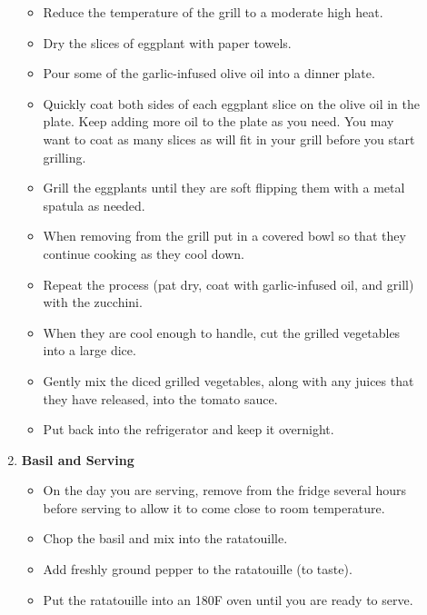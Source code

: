 \documentclass [11pt, letterpaper] {article}
\newcommand \fileName {GrilledRatatouille}
\begin{document}
\begin{description}
\begin{enumerate}
\begin{itemize}
		\item Reduce the temperature of the grill to a moderate high heat.
		\item Dry the slices of eggplant  with paper towels.
		\item Pour some of the garlic-infused olive oil into a dinner plate.
		\item Quickly coat both sides of each eggplant slice on the olive oil in the plate. Keep adding more oil to the plate as you need. You may want to coat as many slices as will fit in your grill before you start grilling.
		\item Grill the eggplants until they are soft flipping them with a metal spatula as needed. 
		\item When removing from the grill put in a covered bowl so that they continue cooking as they cool down.
		\item Repeat the process (pat dry, coat with garlic-infused oil, and grill) with the zucchini.
		\item When they are cool enough to handle, cut the grilled vegetables into a large dice.
		\item Gently mix the diced grilled vegetables, along with any juices that they have released, into the tomato sauce.
		\item Put back into the refrigerator and keep it overnight.
	\end{itemize}
	\item{\bf Basil and Serving}
	\begin{itemize}	
		\item On the day you are serving, remove from the fridge several hours before serving to allow it to come close to room temperature.
		\item Chop the basil and mix into the ratatouille.
		\item Add freshly ground pepper to the ratatouille (to taste).
		\item Put the ratatouille into an 180F oven until you are ready to serve.
	\end{itemize}	
     	\end{enumerate}         
\end{description}

\end{document}
